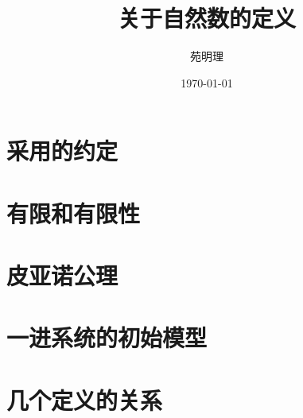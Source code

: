 \documentclass[a4paper,12pt]{article}
\title{关于自然数的定义}
\author{苑明理}
\date{\monthyeardate\today}
\begin{document}
\begingroup
\let\newpage\relax
\maketitle
\endgroup

\renewcommand\contentsname{目录}
\setcounter{tocdepth}{2}
\tableofcontents

\newpage

\section{采用的约定}

\section{有限和有限性}

\section{皮亚诺公理}

\section{一进系统的初始模型}

\section{几个定义的关系}
\end{document}
